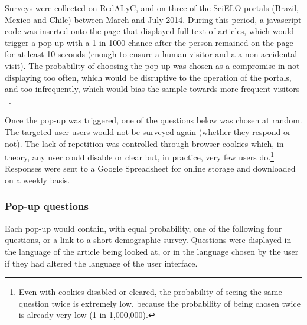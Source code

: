 Surveys were collected on RedALyC, and on three of the SciELO portals (Brazil, Mexico and Chile) between March and July 2014. During this period, a javascript code was inserted onto the page that displayed full-text of articles, which would trigger a pop-up with a 1 in 1000 chance after the person remained on the page for at least 10 seconds (enough to ensure a human visitor and a a non-accidental visit). The probability of choosing the pop-up was chosen as a compromise in not displaying too often, which would be disruptive to the operation of the portals, and too infrequently, which would bias the sample towards more frequent visitors ~\citep{Comley2000}.

Once the pop-up was triggered, one of the questions below was chosen at random. The targeted user users would not be surveyed again (whether they respond or not). The lack of repetition was controlled through browser cookies which, in theory, any user could disable or clear but, in practice, very few users do.\footnote{Even with cookies disabled or cleared, the probability of seeing the same question twice is extremely low, because the probability of being chosen twice is already very low (1 in 1,000,000).} Responses were sent to a Google Spreadsheet for online storage and downloaded on a weekly basis.

\subsubsection{Pop-up questions}
\label{pop-upquestions}

Each pop-up would contain, with equal probability, one of the following four questions, or a link to a short demographic survey. Questions were displayed in the language of the article being looked at, or in the language chosen by the user if they had altered the language of the user interface.



